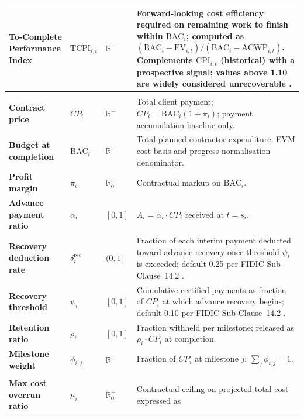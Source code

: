 \begin{table}[htbp]
\begin{tabular}{>{\bfseries}p{3.2cm} p{1.9cm} p{1.2cm} p{7.2cm}}
  To-Complete Performance Index
    & $\mathrm{TCPI}_{i,t}$ & $\mathbb{R}^+$
    & Forward-looking cost efficiency required on remaining work to
      finish within $\mathrm{BAC}_i$; computed as
      $(\mathrm{BAC}_i - \mathrm{EV}_{i,t}) /
       (\mathrm{BAC}_i - \mathrm{ACWP}_{i,t})$.
      Complements $\mathrm{CPI}_{i,t}$ (historical) with a prospective
      signal; values above 1.10 are widely considered unrecoverable
      \citep{Fleming2010}. \\
    \midrule
    \multicolumn{4}{l}{\textit{Contract}} \\
    \midrule
    \rowcolor{RowAlt}
    Contract price
      & $CP_i$ & $\mathbb{R}^+$
      & Total client payment; $CP_i = \mathrm{BAC}_i(1+\pi_i)$;
        payment accumulation baseline only. \\
    Budget at completion
      & $\mathrm{BAC}_i$ & $\mathbb{R}^+$
      & Total planned contractor expenditure; EVM cost basis and
        progress normalisation denominator. \\
    \rowcolor{RowAlt}
    Profit margin
      & $\pi_i$ & $\mathbb{R}^+_0$
      & Contractual markup on $\mathrm{BAC}_i$. \\
    Advance payment ratio
      & $\alpha_i$ & $[0,1]$
      & $A_i = \alpha_i \cdot CP_i$ received at $t = s_i$. \\
    \rowcolor{RowAlt}
    Recovery deduction rate
      & $\delta_i^{\mathrm{rec}}$ & $(0,1]$
      & Fraction of each interim payment deducted toward advance
        recovery once threshold $\psi_i$ is exceeded; default 0.25
        per FIDIC Sub-Clause~14.2 \citep{FIDIC2017}. \\
    Recovery threshold
      & $\psi_i$ & $[0,1]$
      & Cumulative certified payments as fraction of $CP_i$ at which
        advance recovery begins; default 0.10 per FIDIC
        Sub-Clause~14.2 \citep{FIDIC2017}. \\
    \rowcolor{RowAlt}
    Retention ratio
      & $\rho_i$ & $[0,1]$
      & Fraction withheld per milestone; released as $\rho_i \cdot
        CP_i$ at completion. \\
    Milestone weight
      & $\phi_{i,j}$ & $\mathbb{R}^+$
      & Fraction of $CP_i$ at milestone $j$;\;
        $\sum_j \phi_{i,j} = 1$. \\
    \midrule
    \multicolumn{4}{l}{\textit{Termination}} \\
    \midrule
    \rowcolor{RowAlt}
    Max cost overrun ratio
      & $\mu_i$ & $\mathbb{R}^+_0$
      & Contractual ceiling on projected total cost expressed as

\end{tabular}
\end{table}
